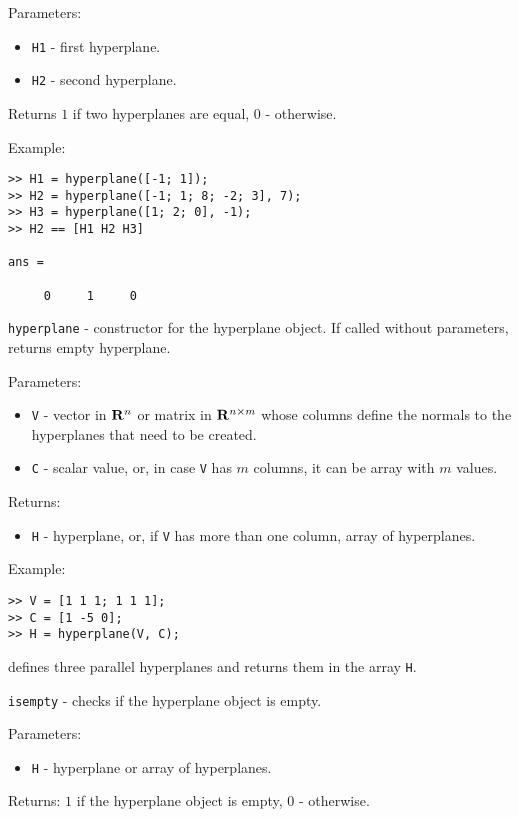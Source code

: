Parameters:
\begin{itemize}
\item {\tt H1} - first hyperplane.
\item {\tt H2} - second hyperplane.
\end{itemize}

Returns $1$ if two hyperplanes are equal, $0$ - otherwise.

Example:
{\tt \begin{verbatim}
>> H1 = hyperplane([-1; 1]);
>> H2 = hyperplane([-1; 1; 8; -2; 3], 7);
>> H3 = hyperplane([1; 2; 0], -1);
>> H2 == [H1 H2 H3]

ans =

     0     1     0
\end{verbatim} }

\newpage

{\Large {\tt hyperplane}} - constructor for the hyperplane object.
If called without parameters, returns empty hyperplane.

Parameters:
\begin{itemize}
\item {\tt V} - vector in ${\bf R}^n$ or matrix in ${\bf R}^{n\times m}$ whose
columns define the normals to the hyperplanes that need to be created.
\item {\tt C} - scalar value, or, in case {\tt V} has $m$ columns, it can be
array with $m$ values.
\end{itemize}

Returns:
\begin{itemize}
\item {\tt H} - hyperplane, or, if {\tt V} has more than one column,
array of hyperplanes.
\end{itemize}

Example:
{\tt \begin{verbatim}
>> V = [1 1 1; 1 1 1];
>> C = [1 -5 0];
>> H = hyperplane(V, C);
\end{verbatim} }
defines three parallel hyperplanes and returns them in the array {\tt H}.

\newpage

{\Large {\tt isempty}} - checks if the hyperplane object is empty.

Parameters:
\begin{itemize}
\item {\tt H} - hyperplane or array of hyperplanes.
\end{itemize}

Returns: $1$ if the hyperplane object is empty, $0$ - otherwise.

